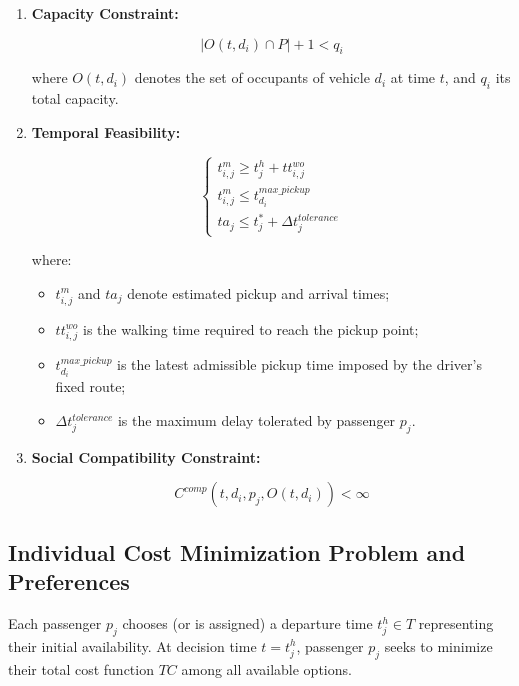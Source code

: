\documentclass[12pt, a4paper]{article}
\begin{document}
\begin{enumerate}

    \item \textbf{Capacity Constraint:}

$$
|O(t,d_i)\cap P|+1<q_i
$$

where $O(t,d_i)$ denotes the set of occupants of vehicle $d_i$ at time $t$, and $q_i$ its total capacity.

    \item \textbf{Temporal Feasibility:}

$$
\begin{cases}
t_{i,j}^m \geq t_j^h+tt_{i,j}^{wo}
\\
t_{i,j}^m \leq t_{d_i}^{max\_pickup}
\\
ta_j \leq t_j^*+\Delta t_j^{tolerance}
\end{cases}
$$

where:

\begin{itemize}
    \item $t_{i,j}^m$ and $ta_j$ denote estimated pickup and arrival times;

    \item $tt_{i,j}^{wo}$ is the walking time required to reach the pickup point;

    \item $t_{d_i}^{max\_pickup}$ is the latest admissible pickup time imposed by the driver's fixed route;

    \item $\Delta t_j^{tolerance}$ is the maximum delay tolerated by passenger $p_j$.
\end{itemize}

    \item \textbf{Social Compatibility Constraint:}

$$
C^{comp}(t,d_i,p_j,O(t,d_i))<\infty
$$

\end{enumerate}

\subsection{Individual Cost Minimization Problem and Preferences}

Each passenger $p_j$ chooses (or is assigned) a departure time $t_j^h\in T$ representing their initial availability. At decision time $t=t_j^h$, passenger $p_j$ seeks to minimize their total cost function $TC$ among all available options.
\end{document}
